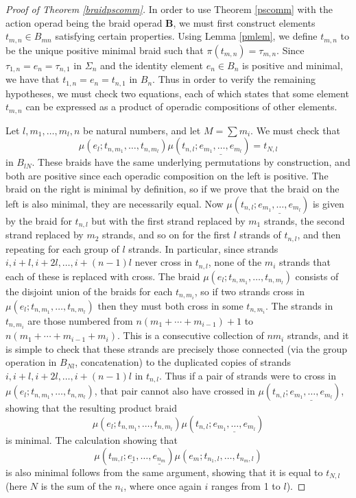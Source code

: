 \documentclass{amsbook} %
\newcommand{\mb}{\mathbf}
\numberwithin{section}{chapter}
\begin{document}
\begin{proof}[Proof of Theorem \ref{braidpscomm}]
In order to use Theorem \ref{pscomm} with the action operad being the braid operad $\mb{B}$, we must first construct elements $t_{m,n} \in B_{mn}$ satisfying certain properties.  Using Lemma \ref{pmlem}, we define $t_{m,n}$ to be the unique positive minimal braid such that $\pi(t_{m,n}) = \tau_{m,n}$.  Since $\tau_{1,n} = e_{n} = \tau_{n,1}$ in $\Sigma_{n}$ and the identity element $e_{n} \in B_{n}$ is positive and minimal, we have that $t_{1,n} = e_{n} = t_{n,1}$ in $B_{n}$.  Thus in order to verify the remaining hypotheses, we must check two equations, each of which states that some element $t_{m,n}$ can be expressed as a product of operadic compositions of other elements.

Let $l, m_{1}, \ldots, m_{l}, n$ be natural numbers, and let $M = \sum m_{i}$.  We must check that
\[
\mu(e_{l}; t_{n, m_{1}}, \ldots, t_{n, m_{l}}) \mu(t_{n,l}; \underline{e_{m_{1}}, \ldots, e_{m_{l}}}) = t_{N, l}
\]
in $B_{lN}$.  These braids have the same underlying permutations by construction, and both are positive since each operadic composition on the left is positive.  The braid on the right is minimal by definition, so if we prove that the braid on the left is also minimal, they are necessarily equal.  Now $\mu(t_{n,l}; \underline{e_{m_{1}}, \ldots, e_{m_{l}}})$ is given by the braid for $t_{n,l}$ but with the first strand replaced by $m_{1}$ strands, the second strand replaced by $m_{2}$ strands, and so on for the first $l$ strands of $t_{n,l}$, and then repeating for each group of $l$ strands.  In particular, since strands $i, i+l, i+2l, \ldots, i + (n-1)l$ never cross in $t_{n,l}$, none of the $m_{i}$ strands that each of these is replaced with cross.  The braid $\mu(e_{l}; t_{n, m_{1}}, \ldots, t_{n, m_{l}})$ consists of the disjoint union of the braids for each $t_{n,m_{i}}$, so if two strands cross in $\mu(e_{l}; t_{n, m_{1}}, \ldots, t_{n, m_{l}})$ then they must both cross in some $t_{n,m_{i}}$.  The strands in $t_{n,m_{i}}$ are those numbered from $n(m_{1} + \cdots + m_{i-1}) + 1$ to $n(m_{1} + \cdots + m_{i-1} + m_{i})$.  This is a consecutive collection of $nm_{i}$ strands, and it is simple to check that these strands are precisely those connected (via the group operation in $B_{Nl}$, concatenation) to the duplicated copies of strands $i, i+l, i+2l, \ldots, i + (n-1)l$ in $t_{n,l}$.  Thus if a pair of strands were to cross in $\mu(e_{l}; t_{n, m_{1}}, \ldots, t_{n, m_{l}})$, that pair cannot also have crossed in $\mu(t_{n,l}; \underline{e_{m_{1}}, \ldots, e_{m_{l}}})$, showing that the resulting product braid
\[
\mu(e_{l}; t_{n, m_{1}}, \ldots, t_{n, m_{l}}) \mu(t_{n,l}; \underline{e_{m_{1}}, \ldots, e_{m_{l}}})
\]
is minimal.  The calculation showing that
\[
\mu(t_{m,l}; \underline{e_{1}}, \ldots, \underline{e_{n_{m}}}) \mu(e_{m}; t_{n_{1}, l}, \ldots, t_{n_{m}, l})
\]
is also minimal follows from the same argument, showing that it is equal to $t_{N, l}$ (here $N$ is the sum of the $n_{i}$, where once again $i$ ranges from 1 to $l$).


\end{proof}
\end{document}
